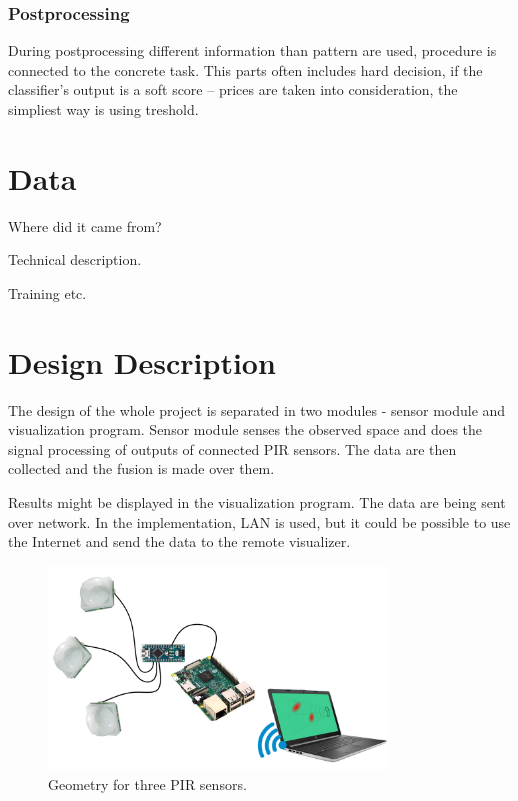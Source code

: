 \subsection*{Postprocessing}
During postprocessing different information than pattern are used, procedure is
connected to the concrete task. This parts often includes hard decision, if the
classifier's output is a soft score -- prices are taken into consideration,
the simpliest way is using treshold.




\chapter{Data}

Where did it came from?

Technical description.

Training etc.



\chapter{Design Description}

The design of the whole project is separated in two modules - sensor module
and visualization program. Sensor module senses the observed space and does the
signal processing of outputs of connected PIR sensors. The data are then collected
and the fusion is made over them.

Results might be displayed in the visualization program. The data are being sent
over network. In the implementation, LAN is used, but it could be possible to
use the Internet and send the data to the remote visualizer.

\begin{figure}[h!]
\begin{center}
\includegraphics[width=0.8\textwidth]{obrazky-figures/design.png}
\caption{Geometry for three PIR sensors.\label{fig:design}}
\end{center}
\end{figure}

